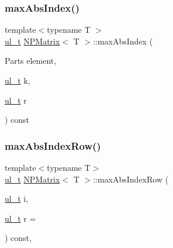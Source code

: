\subsubsection{\texorpdfstring{maxAbsIndex()}{maxAbsIndex()}}
{\footnotesize\ttfamily template$<$typename T $>$ \\
\mbox{\hyperlink{group___n_algebra_ga1b140a2034db3f5dfe18a987745df43a}{ul\+\_\+t}} \mbox{\hyperlink{class_n_p_matrix}{N\+P\+Matrix}}$<$ T $>$\+::max\+Abs\+Index (\begin{DoxyParamCaption}\item[{Parts}]{element,  }\item[{\mbox{\hyperlink{group___n_algebra_ga1b140a2034db3f5dfe18a987745df43a}{ul\+\_\+t}}}]{k,  }\item[{\mbox{\hyperlink{group___n_algebra_ga1b140a2034db3f5dfe18a987745df43a}{ul\+\_\+t}}}]{r }\end{DoxyParamCaption}) const\hspace{0.3cm}{\ttfamily [protected]}}

\mbox{\label{class_n_p_matrix_a332d3f82121d71e1e349aa450af39207}} 
\subsubsection{\texorpdfstring{maxAbsIndexRow()}{maxAbsIndexRow()}}
{\footnotesize\ttfamily template$<$typename T$>$ \\
\mbox{\hyperlink{group___n_algebra_ga1b140a2034db3f5dfe18a987745df43a}{ul\+\_\+t}} \mbox{\hyperlink{class_n_p_matrix}{N\+P\+Matrix}}$<$ T $>$\+::max\+Abs\+Index\+Row (\begin{DoxyParamCaption}\item[{\mbox{\hyperlink{group___n_algebra_ga1b140a2034db3f5dfe18a987745df43a}{ul\+\_\+t}}}]{i,  }\item[{\mbox{\hyperlink{group___n_algebra_ga1b140a2034db3f5dfe18a987745df43a}{ul\+\_\+t}}}]{r = {} }\end{DoxyParamCaption}) const\hspace{0.3cm}{\ttfamily [inline]}, {\ttfamily [protected]}}

\mbox{\label{class_n_p_matrix_a2b5a2c3d646df900367ad91450d1ef33}} 
